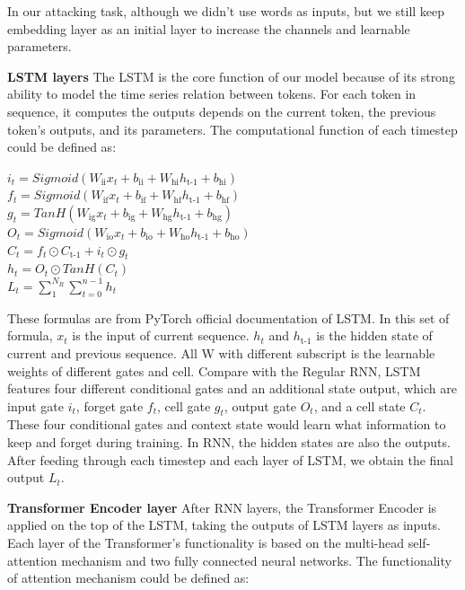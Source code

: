 
In our attacking task, although we didn’t use words as inputs, but we still keep embedding layer as an initial layer to increase the channels and learnable parameters.

\noindent\textbf{LSTM layers} \qquad		The LSTM is the core function of our model because of its strong ability to model the time series relation between tokens. For each token in sequence, it computes the outputs depends on the current token, the previous token’s outputs, and its parameters. The computational function of each timestep could be defined as: 

\begin{center}
\(i_t=Sigmoid(W_\text{ii} x_t+ b_\text{ii}  +W_\text{hi} h_\text{t-1}+ b_\text{hi})\)
\\
\(f_t=Sigmoid(W_\text{if} x_t+ b_\text{if}  +W_\text{hf} h_\text{t-1}+ b_\text{hf})\)
\\\(g_t=TanH(W_\text{ig} x_t+ b_\text{ig}  +W_\text{hg} h_\text{t-1}+ b_\text{hg})\)
\\
\(O_t=Sigmoid(W_\text{io} x_t+ b_\text{io}  +W_\text{ho} h_\text{t-1}+ b_\text{ho})\)
\\
\(C_t=f_t \odot C_\text{t-1}+i_t \odot g_t\)
\\
\(h_t=O_t \odot TanH(C_t)\)
\\
\(L_t = \sum_{1}^{N_R} \sum_{t=0}^{n-1}h_t\)
\end{center}



These formulas are from PyTorch official documentation of LSTM. In this set of formula, \(x_t\) is the input of current sequence. \(h_t\) and \(h_\text{t-1}\) is the hidden state of current and previous sequence. All W with different subscript is the learnable weights of different gates and cell. Compare with the Regular RNN, LSTM features four different conditional gates and an additional state output, which are input gate \(i_t\), forget gate \(f_t\), cell gate \(g_t\), output gate \(O_t\), and a cell state \(C_t\). These four conditional gates and context state would learn what information to keep and forget during training. In RNN, the hidden states are also the outputs. After feeding through each timestep and each layer of LSTM, we obtain the final output \(L_t\).

\noindent\textbf{Transformer Encoder layer} \qquad		After RNN layers, the Transformer Encoder is applied on the top of the LSTM, taking the outputs of LSTM layers as inputs. Each layer of the Transformer’s functionality is based on the multi-head self-attention mechanism and two fully connected neural networks. The functionality of attention mechanism could be defined as:

